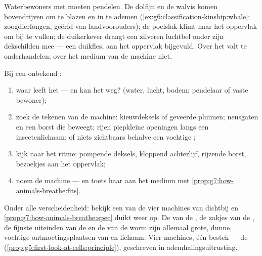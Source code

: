 \begin{example}\label{ex:g7:how-animals-breathe:airinwater}
Waterbewoners met  moeten pendelen. De dolfijn en de walvis komen
bovendrijven om te blazen en in te ademen
(\cref{ex:g6:classification-kinship:whale}: zoogdierlongen, geërfd van
landvoorouders); de poelslak klimt naar het oppervlak om bij te vullen;
de duikerkever draagt een zilveren luchtbel onder zijn dekschilden mee ---
een duikfles, aan het oppervlak bijgevuld. Over het  valt te
onderhandelen; over het medium van de machine niet.
\end{example}

\begin{method}\label{met:g7:how-animals-breathe:read}
Bij een onbekend :
\begin{enumerate}
  \item waar leeft het --- en kan het weg? (water, lucht, bodem;
        pendelaar of vaste bewoner);
  \item zoek de tekenen van de machine: kieuwdeksels of geveerde
        pluimen; neusgaten en een borst die beweegt; rijen piepkleine
        openingen langs een insectenlichaam; of niets zichtbaars behalve
        een vochtige ;
  \item kijk naar het ritme: pompende deksels, kloppend achterlijf,
        rijzende borst, bezoekjes aan het oppervlak;
  \item noem de machine --- en toets haar aan het medium met
        \cref{prop:g7:how-animals-breathe:fits}.
\end{enumerate}
\end{method}

\begin{remark}\label{rem:g7:how-animals-breathe:same}
Onder alle verscheidenheid: bekijk een van de vier machines van dichtbij
en \cref{prop:g7:how-animals-breathe:spec} duikt weer op. De  van de
, de zakjes van de , de fijnste uiteinden van de  en de
 van de worm zijn allemaal grote, dunne, vochtige ontmoetingsplaatsen
van  en lichaam. Vier machines, één bestek --- de  (\cref{prop:g5:first-look-at-cells:principle}), geschreven in
ademhalingsuitrusting.
\end{remark}

